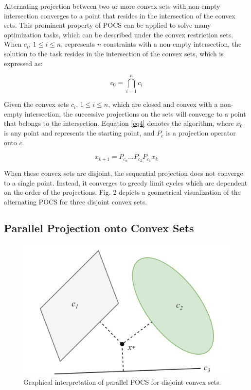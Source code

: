 \documentclass[conference]{IEEEtran}
\begin{document}
Alternating projection between two or more convex sets with non-empty intersection converges to a point that resides in the intersection of the convex sets. This prominent property of POCS can be applied to solve many optimization tasks, which can be described under the convex restriction sets. When $c_i$, $1 \leq i \leq n$, represents $n$ constraints with a non-empty intersection, the solution to the task resides in the intersection of the convex sets, which is expressed as: 


\begin{equation}
c_0 = \bigcap_{i=1}^{n}c_{i}  \label{eq3}
\end{equation}

Given the convex sets $c_i$, $ 1  \leq i \leq n$, which are closed and convex with a non-empty intersection, the successive projections on the sets will converge to a point that belongs to the intersection. Equation \eqref{eq4} denotes the algorithm, where $x_0$ is any point and represents the starting point, and $P_c$ is a projection operator onto $c$.

\begin{equation}
x_{k+1} = P_{c_n}...P_{c_2}P_{c_1}x_k \label{eq4}
\end{equation}

When these convex sets are disjoint, the sequential projection does not converge to a single point. Instead, it converges to greedy limit cycles which are dependent on the order of the projections. Fig. 2 depicts a geometrical visualization of the alternating POCS for three disjoint convex sets.


\subsection{Parallel Projection onto Convex Sets}

\begin{figure}[t]
\centering
\includegraphics[width=0.9\columnwidth]{figures/fig3_v3.png}
\caption{Graphical interpretation of parallel POCS for disjoint convex sets.}
\end{figure}
\end{document}
